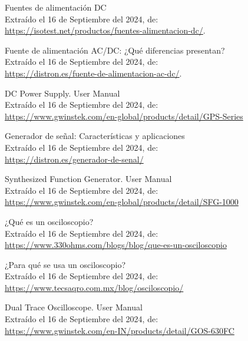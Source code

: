 \documentclass[letter,twoside,11pt]{article}
\begin{document}
\begin{thebibliography}{99}

 Fuentes de alimentación DC \\
Extraído el 16 de Septiembre del 2024, de: \\
\url{https://isotest.net/productos/fuentes-alimentacion-dc/}.

 Fuente de alimentación AC/DC: ¿Qué diferencias presentan? \\
Extraído el 16 de Septiembre del 2024, de: \\
\url{https://distron.es/fuente-de-alimentacion-ac-dc/}.

 DC Power Supply. User Manual \\
Extraído el 16 de Septiembre del 2024, de: \\
\url{https://www.gwinstek.com/en-global/products/detail/GPS-Series}

 Generador de señal: Características y aplicaciones \\
Extraído el 16 de Septiembre del 2024, de: \\
\url{https://distron.es/generador-de-senal/}

 Synthesized Function Generator. User Manual \\
Extraído el 16 de Septiembre del 2024, de: \\
\url{https://www.gwinstek.com/en-global/products/detail/SFG-1000}

 ¿Qué es un osciloscopio? \\
Extraído el 16 de Septiembre del 2024, de: \\
\url{https://www.330ohms.com/blogs/blog/que-es-un-osciloscopio}

 ¿Para qué se usa un osciloscopio? \\
Extraído el 16 de Septiembre del 2024, de: \\
\url{https://www.tecsaqro.com.mx/blog/osciloscopio/}

 Dual Trace Oscilloscope. User Manual \\
Extraído el 16 de Septiembre del 2024, de: \\
\url{https://www.gwinstek.com/en-IN/products/detail/GOS-630FC}

\end{thebibliography}
\end{document}
